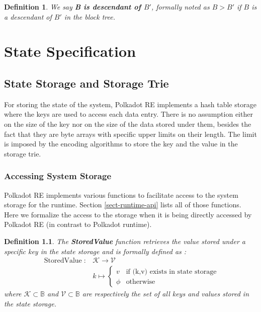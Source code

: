 \documentclass{book}
\newcommand{\tmop}[1]{\ensuremath{\operatorname{#1}}}
\newcommand{\tmstrong}[1]{\textbf{#1}}
\newcommand{\tmtextbf}[1]{{\bfseries{#1}}}
\newtheorem{definition}{Definition}
\providecommand{\tmop}[1]{\ensuremath{\mathrm{#1}}}
\providecommand{\tmstrong}[1]{\tmtextbf{#1}}
\providecommand{\tmtextbf}[1]{\tmtextbf{#1}}
\newtheorem{definition}{Definition}
\begin{document}
\begin{definition}
  We say {\tmstrong{B is descendant of $B'$}}, formally noted as {\tmstrong{$B
  > B'$}} if $B$ is a descendant of $B'$ in the block tree.
\end{definition}

\chapter{State Specification}\label{chap-state-spec}

\section{State Storage and Storage Trie}

For storing the state of the system, Polkadot RE implements a hash table
storage where the keys are used to access each data entry. There is no
assumption either on the size of the key nor on the size of the data stored
under them, besides the fact that they are byte arrays with specific upper
limits on their length. The limit is imposed by the encoding algorithms to
store the key and the value in the storage trie.

\subsection{Accessing System Storage }

Polkadot RE implements various functions to facilitate access to the system
storage for the runtime. Section \ref{sect-runtime-api} lists all of those
functions. Here we formalize the access to the storage when it is being
directly accessed by Polkadot RE (in contrast to Polkadot runtime).

\begin{definition}
  \label{defn-stored-value}The \label{autolab24}{\tmstrong{StoredValue}}
  function retrieves the value stored under a specific key in the state
  storage and is formally defined as :
  \[ \begin{array}{cc}
       \tmop{StoredValue} : & \mathcal{K} \rightarrow \mathcal{V}\\
       & k \mapsto \left\{ \begin{array}{cc}
         v & \text{if (k,v) exists in state storage}\\
         \phi & \tmop{otherwise}
       \end{array} \right.
     \end{array} \]
  where $\mathcal{K} \subset \mathbb{B}$ and $\mathcal{V} \subset \mathbb{B}$
  are respectively the set of all keys and values stored in the state storage.
  
  \ 
\end{definition}
\end{document}
